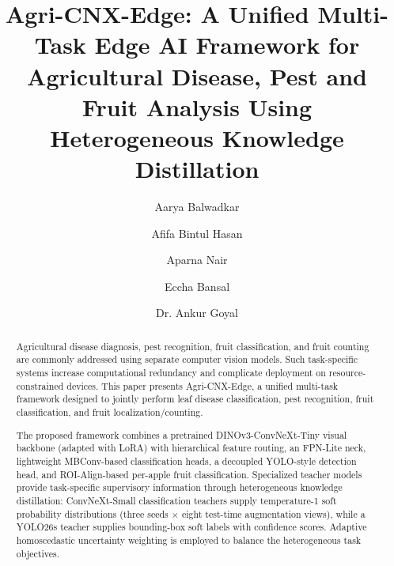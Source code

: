 \documentclass[preprint,12pt]{elsarticle}
\begin{document}
\begin{frontmatter}


\title{
Agri-CNX-Edge: A Unified Multi-Task Edge AI Framework for
Agricultural Disease, Pest and Fruit Analysis Using
Heterogeneous Knowledge Distillation
}


\author[inst1]{Aarya Balwadkar}
\author[inst1]{Afifa Bintul Hasan}
\author[inst1]{Aparna Nair}
\author[inst1]{Eccha Bansal}
\author[inst1]{Dr. Ankur Goyal}



\begin{abstract}

Agricultural disease diagnosis, pest recognition, fruit classification,
and fruit counting are commonly addressed using separate computer vision
models. Such task-specific systems increase computational redundancy and
complicate deployment on resource-constrained devices. This paper presents
Agri-CNX-Edge, a unified multi-task framework designed to jointly perform
leaf disease classification, pest recognition, fruit classification, and
fruit localization/counting.

The proposed framework combines a pretrained DINOv3-ConvNeXt-Tiny
visual backbone (adapted with LoRA) with hierarchical feature routing,
an FPN-Lite neck, lightweight MBConv-based classification heads, a
decoupled YOLO-style detection head, and ROI-Align-based per-apple
fruit classification.
Specialized teacher models provide task-specific supervisory information
through heterogeneous knowledge distillation: ConvNeXt-Small
classification teachers supply temperature-1 soft probability
distributions (three seeds $\times$ eight test-time augmentation views),
while a YOLO26s teacher supplies bounding-box soft labels with
confidence scores.
Adaptive homoscedastic uncertainty weighting is employed to balance the
heterogeneous task objectives.


\end{abstract}
\end{frontmatter}
\end{document}
